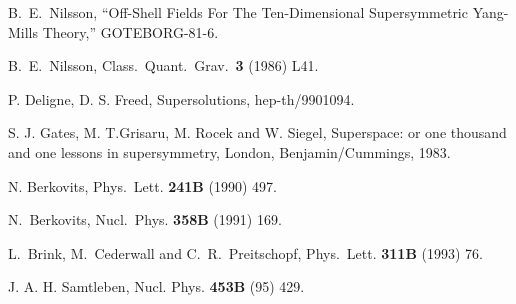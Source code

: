 \documentclass[a4paper,12pt]{book}
\begin{document}
\begin{thebibliography}{999}
  B.~E.~Nilsson, ``Off-Shell Fields For The Ten-Dimensional
Supersymmetric Yang-Mills Theory,'' GOTEBORG-81-6.

  B.~E.~Nilsson, Class.~Quant.~Grav.~\textbf{3} (1986) L41.

  P. Deligne, D. S. Freed, Supersolutions, hep-th/9901094.

  S. J. Gates, M. T.Grisaru, M. Rocek and W. Siegel,
Superspace: or one thousand and one lessons in supersymmetry, London,
Benjamin/Cummings, 1983.

  N. Berkovits, Phys.~Lett. \textbf{241B} (1990) 497.

  N.~Berkovits, Nucl.~Phys. \textbf{358B} (1991) 169.

  L.~Brink, M.~Cederwall and C.~R.~Preitschopf, Phys.~Lett. 
\textbf{311B} (1993) 76.

  J. A. H. Samtleben, Nucl. Phys. \textbf{453B} (95) 429.
\end{thebibliography}
\end{document}
